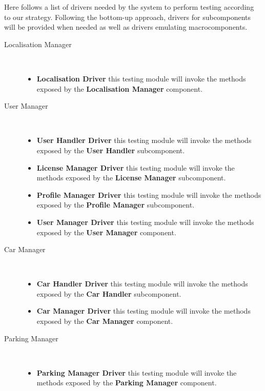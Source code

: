 		Here follows a list of drivers needed by the system to perform testing according to our strategy. Following the bottom-up approach, drivers for subcomponents will be provided when needed as well as drivers emulating macrocomponents.
		
		\begin{description}
		\item[Localisation Manager]~\\
			\begin{itemize}
				\item \textbf{Localisation Driver} this testing module will invoke the methods exposed by the \textbf{Localisation Manager} component.
			\end{itemize}
		\item[User Manager]~\\ 
			\begin{itemize}
				\item \textbf{User Handler Driver} this testing module will invoke the methods exposed by the \textbf{User Handler} subcomponent.
				\item \textbf{License Manager Driver} this testing module will invoke the methods exposed by the \textbf{License Manager} subcomponent.
				\item \textbf{Profile Manager Driver} this testing module will invoke the methods exposed by the \textbf{Profile Manager} subcomponent.
				\item \textbf{User Manager Driver} this testing module will invoke the methods exposed by the \textbf{User Manager} component.
			\end{itemize}
		\item[Car Manager]~\\
			\begin{itemize}
				\item \textbf{Car Handler Driver} this testing module will invoke the methods exposed by the \textbf{Car Handler} subcomponent.
				\item \textbf{Car Manager Driver} this testing module will invoke the methods exposed by the \textbf{Car Manager} component.
			\end{itemize}
		\item[Parking Manager]~\\
			\begin{itemize}
				\item \textbf{Parking Manager Driver} this testing module will invoke the methods exposed by the \textbf{Parking Manager} component.
			\end{itemize}

\end{description}
